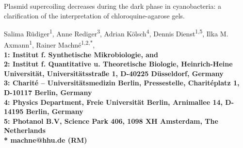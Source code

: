 \documentclass[10pt,a4]{article}
\begin{document}


\begin{flushleft}
{\Large Plasmid supercoiling decreases during the dark phase in
  cyanobacteria: a clarification of the interpretation of
  chloroquine-agarose gels.}

Salima R\"udiger\textsuperscript{1}, 
Anne Rediger\textsuperscript{3},
Adrian K\"olsch\textsuperscript{4},
Dennis Dienst\textsuperscript{1,5},
Ilka M. Axmann\textsuperscript{1},
Rainer Machn\'e\textsuperscript{1,2,*},
\\
\bigskip
\bf{1:} Institut f. Synthetische Mikrobiologie, and\\
\bf{2:} Institut f. Quantitative u. Theoretische Biologie, Heinrich-Heine Universit\"at, Universit\"atsstra\ss{}e 1, D-40225 D\"usseldorf, Germany
\\
\bf{3:} Charit\'e -- Universit\"atsmedizin Berlin, Pressestelle, Charit\'eplatz 1, D-10117 Berlin, Germany
\\
\bf{4:} Physics Department, Freie Universität Berlin, Arnimallee 14, D-14195 Berlin, Germany
\\
\bf{5:} Photanol B.V, Science Park 406, 1098 XH Amsterdam, The Netherlands
\\
\bigskip
* machne@hhu.de (RM)

\end{flushleft}
\end{document}

